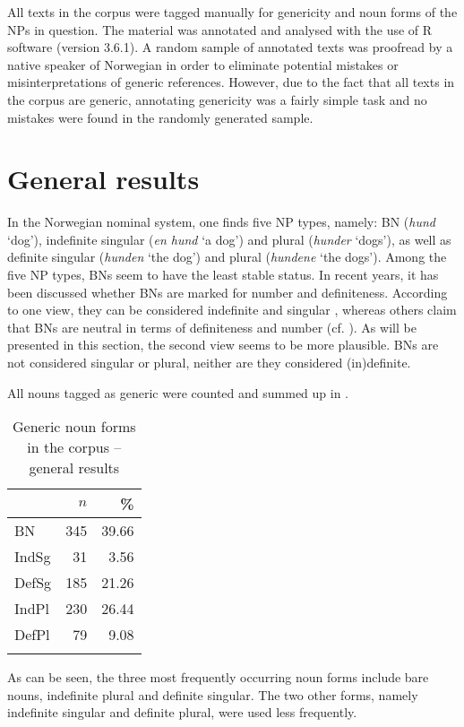 \documentclass[output=paper]{langsci/langscibook}
\begin{document}
All texts in the corpus were tagged manually for genericity and noun forms of the NPs in question. The material was annotated and analysed with the use of R software (version 3.6.1). A random sample of annotated texts was proofread by a native speaker of Norwegian in order to eliminate potential mistakes or misinterpretations of generic references. However, due to the fact that all texts in the corpus are generic, annotating genericity was a fairly simple task and no mistakes were found in the randomly generated sample.

\section{General results}
\label{sec:results}
In the Norwegian nominal system, one finds five NP types, namely: BN (\textit{hund} `dog'), indefinite singular (\textit{en hund} `a dog') and plural (\textit{hunder} `dogs'), as well as definite singular (\textit{hunden} `the dog') and plural (\textit{hundene} `the dogs'). Among the five NP types, BNs seem to have the least stable status. In recent years, it has been discussed whether BNs are marked for number and definiteness. According to one view, they can be considered indefinite and singular \citep{Borthen2003}, whereas others claim that BNs are neutral in terms of definiteness and number (cf. \citealp{Halmoy2016}). As will be presented in this section, the second view seems to be more plausible. BNs are not considered singular or plural, neither are they considered (in)definite.


All nouns tagged as generic were counted and summed up in .

\begin{table}
\caption{Generic noun forms in the corpus -- general results\label{tab:results}}
\begin{tabular}{lrr} 
\lsptoprule  & $n$ & \%\\\midrule
    BN    &  345 & 39.66\\ 
    IndSg &   31 &  3.56\\
    DefSg &  185 & 21.26\\
    IndPl &  230 & 26.44\\
    DefPl &   79 &  9.08\\
\lspbottomrule
\end{tabular}
\end{table}
 
As can be seen, the three most frequently occurring noun forms include bare nouns, indefinite plural and definite singular. The two other forms, namely indefinite singular and definite plural, were used less frequently.
 
\end{document}
